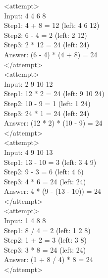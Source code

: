 \documentclass{article} %
\newcommand{\0}{\mathbf{0}}
\begin{document}
\begin{figure}
  \centering
  \begin{tcolorbox}[
      colback=gray!5!white, 
      colframe=black!100!black, 
      width=1\textwidth
  ]
  \small
    <attempt> \\
Input: 4 4 6 8 \\  
Step1: 4 + 8 = 12 (left: 4 6 12) \\  
Step2: 6 - 4 = 2 (left: 2 12) \\  
Step3: 2 * 12 = 24 (left: 24) \\  
Answer: (6 - 4) * (4 + 8) = 24 \\  
</attempt> \\

<attempt> \\
Input: 2 9 10 12 \\  
Step1: 12 * 2 = 24 (left: 9 10 24) \\  
Step2: 10 - 9 = 1 (left: 1 24) \\  
Step3: 24 * 1 = 24 (left: 24) \\  
Answer: (12 * 2) * (10 - 9) = 24 \\  
</attempt> \\

<attempt> \\
Input: 4 9 10 13 \\  
Step1: 13 - 10 = 3 (left: 3 4 9) \\  
Step2: 9 - 3 = 6 (left: 4 6) \\  
Step3: 4 * 6 = 24 (left: 24) \\  
Answer: 4 * (9 - (13 - 10)) = 24 \\  
</attempt> \\

<attempt> \\
Input: 1 4 8 8 \\  
Step1: 8 / 4 = 2 (left: 1 2 8) \\  
Step2: 1 + 2 = 3 (left: 3 8) \\  
Step3: 3 * 8 = 24 (left: 24) \\  
Answer: (1 + 8 / 4) * 8 = 24 \\  
</attempt> \\


\end{tcolorbox}
\end{figure}
\end{document}
